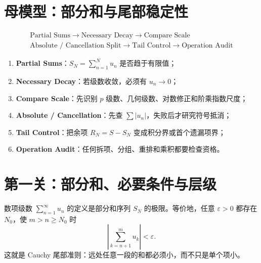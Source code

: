\documentclass[11pt,a4paper,fontset=fandol]{ctexart}
\newcommand{\kw}[1]{\textbf{\color{deep}#1}}
\begin{document}
\section{母模型：部分和与尾部稳定性}
\[
\boxed{\begin{gathered}
\text{Partial Sums}\to\text{Necessary Decay}\to\text{Compare Scale}\\
\text{Absolute / Cancellation Split}\to\text{Tail Control}\to\text{Operation Audit}
\end{gathered}}
\]
\begin{enumerate}
  \item \kw{Partial Sums}：$S_N=\sum_{n=1}^{N}u_n$ 是否趋于有限值；
  \item \kw{Necessary Decay}：若级数收敛，必须有 $u_n\to0$；
  \item \kw{Compare Scale}：先识别 $p$ 级数、几何级数、对数修正和阶乘指数尺度；
  \item \kw{Absolute / Cancellation}：先查 $\sum\lvert u_n\rvert$，失败后才研究符号抵消；
  \item \kw{Tail Control}：把余项 $R_N=S-S_N$ 变成积分界或首个遗漏项界；
  \item \kw{Operation Audit}：任何拆项、分组、重排和乘积都要检查资格。
\end{enumerate}

\begin{center}
\end{center}

\section{第一关：部分和、必要条件与层级}
数项级数 $\sum_{n=1}^{\infty}u_n$ 的定义是部分和序列 $S_N$ 的极限。等价地，任意 $\varepsilon>0$ 都存在 $N_0$，使 $m>n\ge N_0$ 时
\[
\left\lvert\sum_{k=n+1}^{m}u_k\right\rvert<\varepsilon.
\]
这就是 Cauchy 尾部准则：远处任意一段的和都必须小，而不只是单个项小。
\end{document}
